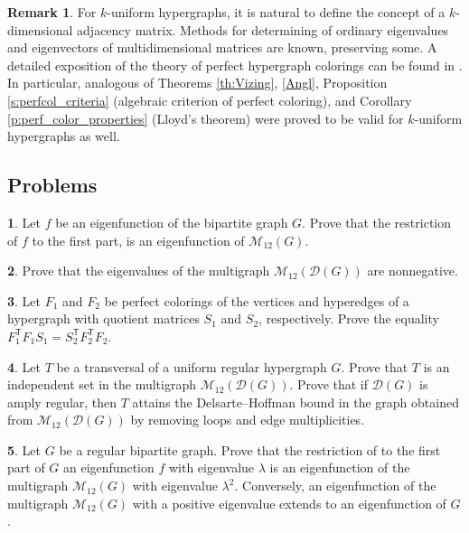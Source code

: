 \documentclass[11pt]{article}
\theoremstyle{definition}
\newtheorem{remark}{Remark}[section]
\newtheorem{exercise}{\quad}
\begin{document}
{{{\begin{remark}
For $k$-uniform hypergraphs, it is natural to define the concept of a $k$-dimensional adjacency matrix. 
Methods for determining of ordinary eigenvalues and eigenvectors of multidimensional matrices are known,
 preserving some. A detailed exposition of the theory of perfect
hypergraph colorings can be found in \cite{Taranenko22}.
  In particular, analogous of 
 Theorems \ref{th:Vizing}, \ref{Angl}, Proposition \ref{s:perfcol_criteria} (algebraic criterion of perfect coloring), and Corollary \ref{p:perf_color_properties} (Lloyd's theorem)
 were proved to be valid for $k$-uniform hypergraphs as well.
\end{remark}


\subsection{Problems}



\begin{exercise}
Let $f$ be an eigenfunction of the bipartite graph $G$. Prove
that the restriction of  $f$ to the first part, is an eigenfunction
of $\mathcal{M}_{12}(G)$.
\end{exercise}

\begin{exercise}\label{exerDH0}
Prove that the eigenvalues of the multigraph
$\mathcal{M}_{12}(\mathcal{D}(G))$ are nonnegative.
\end{exercise}

\begin{exercise}
Let $F_1$ and $F_2$ be perfect colorings of the vertices and hyperedges 
of a hypergraph with quotient matrices $S_1$ and $S_2$, respectively. Prove the equality
$F_1^{\mathsf T}F_1S_1=S_2^{\mathsf T}F_2^{\mathsf T}F_2$.
\end{exercise}

\begin{exercise}\label{exerDH1}
Let $T$ be a transversal of a uniform regular hypergraph $G$.
Prove that $T$ is an independent set in the multigraph
$\mathcal{M}_{12}(\mathcal{D}(G))$. Prove that if
$\mathcal{D}(G)$ is amply regular, then  $T$ 
attains the Delsarte--Hoffman bound in the graph obtained from
$\mathcal{M}_{12}(\mathcal{D}(G))$ by removing loops and edge multiplicities.
\end{exercise}

\begin{exercise}
Let $G$  be a regular bipartite graph.
Prove that the restriction of to the first part  of $G$ an eigenfunction $f$ with eigenvalue
$\lambda$ 
is an eigenfunction of the multigraph $\mathcal{M}_{12}(G)$ with
eigenvalue $\lambda^2$. Conversely,
an eigenfunction of the multigraph $\mathcal{M}_{12}(G)$ with a positive eigenvalue
extends
to an eigenfunction of $G$.
\end{exercise}

}}}
\end{document}
